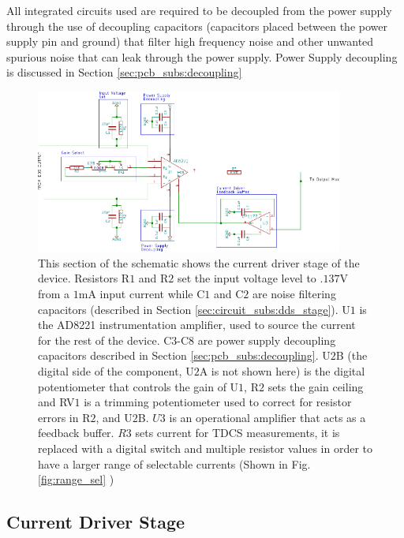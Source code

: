 All integrated circuits used are required to be decoupled from the power supply through the use of decoupling capacitors (capacitors placed between the power supply pin and ground) that filter high frequency noise and other unwanted spurious noise that can leak through the power supply. Power Supply decoupling is discussed in Section \ref{sec:pcb_subs:decoupling}



\begin{figure}[h]
\centering
\includegraphics[width=0.9\textwidth]{../assets/images/Current_Stage/currentstage}
\caption{This section of the schematic shows the current driver stage of the device. Resistors R$1$ and R$2$ set the input voltage level to $.137$V from a $1$mA input current while C$1$ and C$2$ are noise filtering capacitors (described in Section \ref{sec:circuit_subs:dds_stage}). U$1$ is the AD8221 instrumentation amplifier, used to source the current for the rest of the device. C$3$-C$8$ are power supply decoupling capacitors described in Section \ref{sec:pcb_subs:decoupling}. U$2$B (the digital side of the component, U$2$A is not shown here) is the digital potentiometer that controls the gain of U$1$, R$2$ sets the gain ceiling and RV$1$ is a trimming potentiometer used to correct for resistor errors in R$2$, and U$2$B. $U3$ is an operational amplifier that acts as a feedback buffer. $R3$ sets current for TDCS measurements, it is replaced with a digital switch and multiple resistor values in order to have a larger range of selectable currents (Shown in Fig. \ref{fig:range_sel} )}
\label{fig:vtoi_circuit}
\end{figure}




\subsection{Current Driver Stage}
 \label{sec:circuit_subs:vtoi}
 
